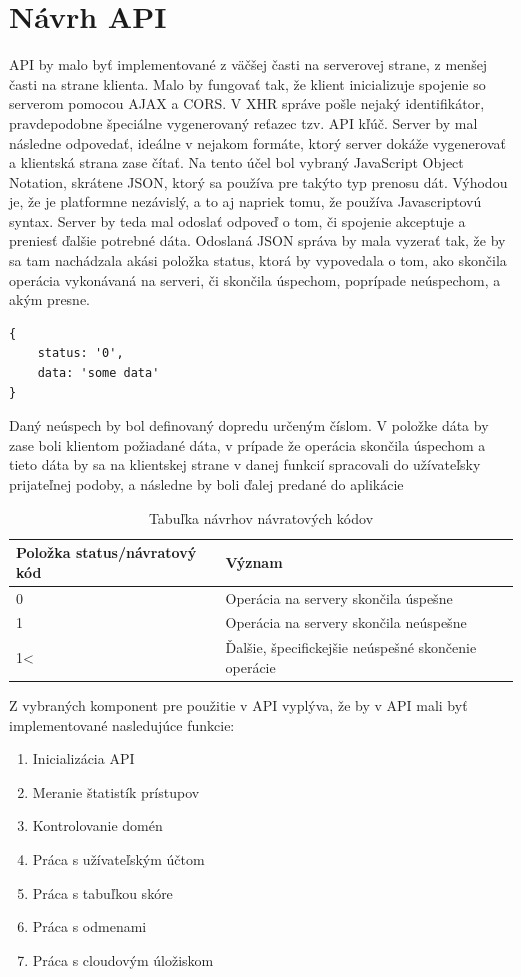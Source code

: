 \section{Návrh API}
API by malo byť implementované z väčšej časti na serverovej strane, z menšej časti na strane klienta. Malo by fungovať tak, že klient inicializuje spojenie so serverom pomocou AJAX a CORS. V XHR správe pošle nejaký identifikátor, pravdepodobne špeciálne vygenerovaný reťazec tzv. API kľúč. Server by mal následne odpovedať, ideálne v nejakom formáte, ktorý server dokáže vygenerovať a klientská strana zase čítať. Na tento účel bol vybraný JavaScript Object Notation, skrátene JSON, ktorý sa používa pre takýto typ prenosu dát. Výhodou je, že je platformne nezávislý, a to aj napriek tomu, že používa Javascriptovú syntax. Server by teda mal odoslať odpoveď o tom, či spojenie akceptuje a preniesť ďalšie potrebné dáta. Odoslaná JSON správa by mala vyzerať tak, že by sa tam nachádzala akási položka status, ktorá by vypovedala o tom, ako skončila operácia vykonávaná na serveri, či skončila úspechom, poprípade neúspechom, a akým presne. 
\begin{lstlisting}[]
{
    status: '0',
    data: 'some data'
}
\end{lstlisting}
Daný neúspech by bol definovaný dopredu určeným číslom. V položke dáta by zase boli klientom požiadané dáta, v prípade že operácia skončila úspechom a tieto dáta by sa na klientskej strane v danej funkcií spracovali do užívateľsky prijateľnej podoby, a následne by boli ďalej predané do aplikácie
\begin{table}[h]
\centering
\begin{tabular}{|l|l|l|}
\hline
Položka status/návratový kód & Význam \\ \hline
0 & Operácia na servery skončila úspešne \\ \hline
1 & Operácia na servery skončila neúspešne \\ \hline
1\textless & Ďalšie, špecifickejšie neúspešné skončenie operácie \\ \hline
\end{tabular}
\label{navratovekody}
\caption{Tabuľka návrhov návratových kódov}
\end{table}

Z vybraných komponent pre použitie v API vyplýva, že by v API mali byť implementované nasledujúce funkcie:
\begin{enumerate}
\item Inicializácia API
\item Meranie štatistík prístupov
\item Kontrolovanie domén
\item Práca s užívateľským účtom
\item Práca s tabuľkou skóre
\item Práca s odmenami
\item Práca s cloudovým úložiskom
\end{enumerate}

